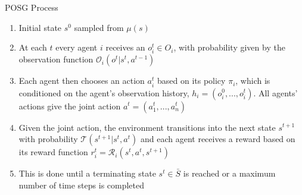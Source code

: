 \begin{frame}{POSG Process}

\begin{enumerate}
    \item<1-> Initial state $s^0$ sampled from $\mu(s)$
    \item<2-> At each $t$ every agent $i$ receives an  $o^{t}_{i} \in O_i$, with probability given by the observation function $\mathcal{O}_i(o^{t}|s^t, a^{t-1})$
    \item<3-> Each agent then chooses an action $a^{t}_{i}$ based on its policy $\pi_{i}$, which is conditioned on the agent's observation history, $h_{i} = (o^{0}_{i}, ..., o_{i}^{t})$. All agents' actions give the joint action $a^t = (a^{t}_{1}, ..., a^{t}_n)$
    \item<4-> Given the joint action, the environment transitions into the next state $s^{t+1}$ with probability $\mathcal{T}(s^{t+1}|s^t, a^t)$ and each agent receives a reward based on its reward function $r^{t}_{i} = \mathcal{R}_{i}(s^t, a^t, s^{t+1})$
    \item<5-> This is done until a terminating state $s^{t} \in \bar{S}$ is reached or a maximum number of time steps is completed
\end{enumerate}
    
\end{frame}


